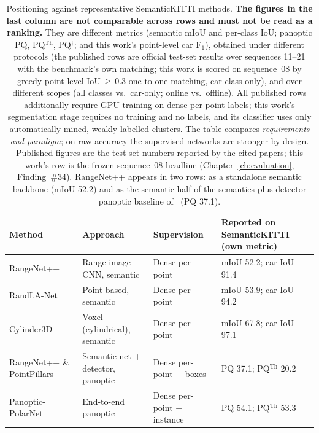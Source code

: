\begin{table}[H]
  \centering
  \caption{Positioning against representative SemanticKITTI methods. \textbf{The
    figures in the last column are not comparable across rows and must not be read as a
    ranking.} They are different metrics (semantic mIoU and per-class IoU; panoptic PQ,
    PQ$^{\text{Th}}$, PQ$^\dagger$; and this work's point-level car F$_1$), obtained
    under different protocols (the published rows are official test-set results over
    sequences 11--21 with the benchmark's own matching; this work is scored on
    sequence~08 by greedy point-level IoU$\,\ge\,$0.3 one-to-one matching, car class
    only), and over different scopes (all classes vs.\ car-only; online vs.\ offline).
    All published rows additionally require GPU training on dense per-point labels;
    this work's segmentation stage requires no training and no labels, and its
    classifier uses only automatically mined, weakly labelled clusters. The table
    compares \emph{requirements and paradigm}; on raw accuracy the supervised networks
    are stronger by design. Published figures are the test-set numbers reported by the
    cited papers; this work's row is the frozen sequence~08 headline (Chapter~\ref{ch:evaluation},
    Finding~\#34). RangeNet++ appears in two rows: as a standalone semantic backbone
    (mIoU 52.2) and as the semantic half of the semantics-plus-detector panoptic
    baseline of~\cite{behley2021panoptic} (PQ 37.1).}
  \label{tab:positioning}
  \small
  \renewcommand{\arraystretch}{1.25}
  \setlength{\tabcolsep}{5pt}
  \begin{tabular}{@{}p{2.7cm}p{3.5cm}p{3.0cm}p{4.4cm}@{}}
    \toprule
    Method & Approach & Supervision & Reported on SemanticKITTI (own metric) \\
    \midrule
    RangeNet++~\cite{milioto2019rangenet++} & Range-image CNN, semantic & Dense per-point & mIoU 52.2; car IoU 91.4 \\
    RandLA-Net~\cite{Hu_2020_CVPR} & Point-based, semantic & Dense per-point & mIoU 53.9; car IoU 94.2 \\
    Cylinder3D~\cite{zhu2021cylindrical} & Voxel (cylindrical), semantic & Dense per-point & mIoU 67.8; car IoU 97.1 \\
    \addlinespace[2pt]
    RangeNet++ \& PointPillars~\cite{behley2021panoptic} & Semantic net + detector, panoptic & Dense per-point + boxes & PQ 37.1; PQ$^{\text{Th}}$ 20.2 \\
    Panoptic-PolarNet~\cite{zhou2021panopticpolarnet} & End-to-end panoptic & Dense per-point + instance & PQ 54.1; PQ$^{\text{Th}}$ 53.3 \\

\end{tabular}
\end{table}
